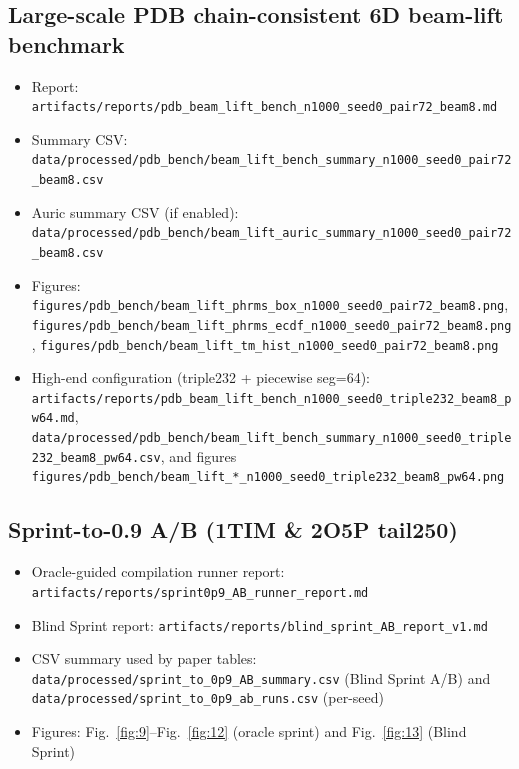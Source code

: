 \subsection*{Large-scale PDB chain-consistent 6D beam-lift benchmark}
\begin{itemize}
  \item Report: \texttt{artifacts/reports/pdb\_beam\_lift\_bench\_n1000\_seed0\_pair72\_beam8.md}
  \item Summary CSV: \texttt{data/processed/pdb\_bench/beam\_lift\_bench\_summary\_n1000\_seed0\_pair72\_beam8.csv}
  \item Auric summary CSV (if enabled): \texttt{data/processed/pdb\_bench/beam\_lift\_auric\_summary\_n1000\_seed0\_pair72\_beam8.csv}
  \item Figures: \texttt{figures/pdb\_bench/beam\_lift\_phrms\_box\_n1000\_seed0\_pair72\_beam8.png}, \texttt{figures/pdb\_bench/beam\_lift\_phrms\_ecdf\_n1000\_seed0\_pair72\_beam8.png}, \texttt{figures/pdb\_bench/beam\_lift\_tm\_hist\_n1000\_seed0\_pair72\_beam8.png}
  \item High-end configuration (triple232 + piecewise seg=64): \texttt{artifacts/reports/pdb\_beam\_lift\_bench\_n1000\_seed0\_triple232\_beam8\_pw64.md}, \texttt{data/processed/pdb\_bench/beam\_lift\_bench\_summary\_n1000\_seed0\_triple232\_beam8\_pw64.csv}, and figures \texttt{figures/pdb\_bench/beam\_lift\_*\_n1000\_seed0\_triple232\_beam8\_pw64.png}
\end{itemize}

\subsection*{Sprint-to-0.9 A/B (1TIM \& 2O5P tail250)}
\begin{itemize}
  \item Oracle-guided compilation runner report: \texttt{artifacts/reports/sprint0p9\_AB\_runner\_report.md}
  \item Blind Sprint report: \texttt{artifacts/reports/blind\_sprint\_AB\_report\_v1.md}
  \item CSV summary used by paper tables: \texttt{data/processed/sprint\_to\_0p9\_AB\_summary.csv} (Blind Sprint A/B) and \texttt{data/processed/sprint\_to\_0p9\_ab\_runs.csv} (per-seed)
  \item Figures: Fig.~\ref{fig:9}--Fig.~\ref{fig:12} (oracle sprint) and Fig.~\ref{fig:13} (Blind Sprint)
\end{itemize}
